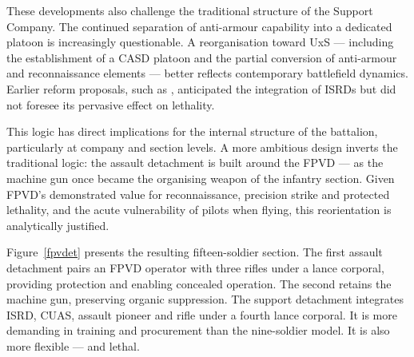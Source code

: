 These developments also challenge the traditional structure of the Support Company. The continued separation of anti-armour capability into a dedicated platoon is increasingly questionable. A reorganisation toward UxS --- including the establishment of a CASD platoon and the partial conversion of anti-armour and reconnaissance elements --- better reflects contemporary battlefield dynamics. Earlier reform proposals, such as \textcite{egerton_2021}, anticipated the integration of ISRDs but did not foresee its pervasive effect on lethality.

This logic has direct implications for the internal structure of the battalion, particularly at company and section levels. A more ambitious design inverts the traditional logic: the assault detachment is built around the FPVD --- as the machine gun once became the organising weapon of the infantry section. Given FPVD's demonstrated value for reconnaissance, precision strike and protected lethality, and the acute vulnerability of pilots when flying, this reorientation is analytically justified.

Figure~\ref{fpvdet} presents the resulting fifteen-soldier section. The first assault detachment pairs an FPVD operator with three rifles under a lance corporal, providing protection and enabling concealed operation. The second retains the machine gun, preserving organic suppression. The support detachment integrates ISRD, CUAS, assault pioneer and rifle under a fourth lance corporal. It is more demanding in training and procurement than the nine-soldier model. It is also more flexible --- and lethal.

